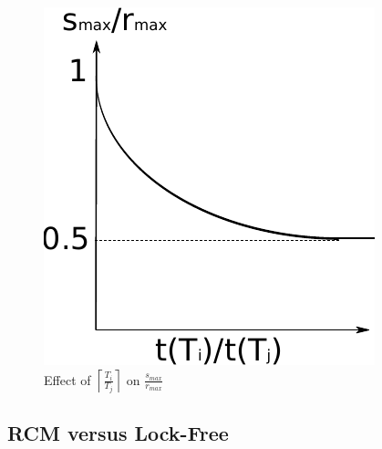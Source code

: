 \documentclass[letter]{sig-alternate}
\begin{document}
\begin{figure}
\begin{centering}
\includegraphics[scale=0.5]{figures/figure14}
\par\end{centering}
\caption{\label{fig14}Effect of $\left\lceil\frac{T_{i}}{T_{j}}\right\rceil$ on
$\frac{s_{max}}{r_{max}}$}
\end{figure}


\subsection{RCM versus Lock-Free}
\end{document}
